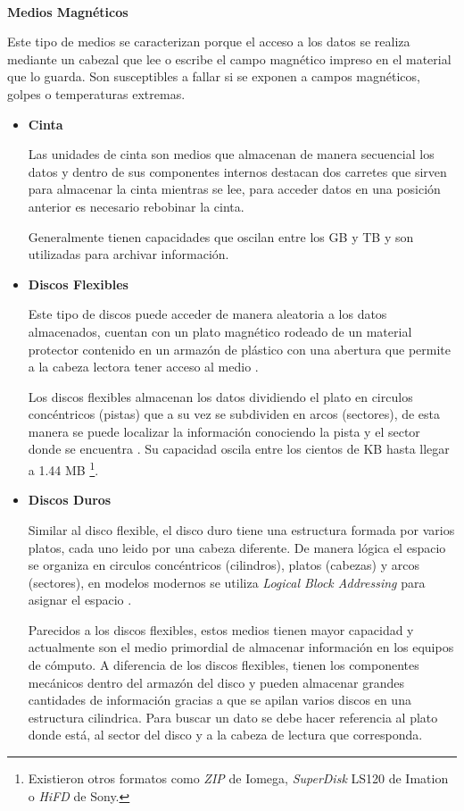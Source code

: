 \textbf{\\ Medios Magn\'{e}ticos \\}

Este tipo de medios se caracterizan porque el acceso a los datos se realiza mediante un cabezal que lee o escribe el campo magn\'{e}tico impreso en el material que lo guarda. Son susceptibles a fallar si se exponen a campos magn\'{e}ticos, golpes o temperaturas extremas.

\begin{itemize}

  \item \textbf{Cinta}

Las unidades de cinta son medios que almacenan de manera secuencial los datos y dentro de sus componentes internos destacan dos carretes que sirven para almacenar la cinta mientras se lee, para acceder datos en una posici\'{o}n anterior es necesario rebobinar la cinta.

Generalmente tienen capacidades que oscilan entre los \textsc{GB} y \textsc{TB}  \cite{_powervault_????} y son utilizadas para archivar informaci\'{o}n.

  \item \textbf{Discos Flexibles}

Este tipo de discos puede acceder de manera aleatoria a los datos almacenados, cuentan con un plato magn\'{e}tico rodeado de un material protector contenido en un armaz\'{o}n de pl\'{a}stico con una abertura que permite a la cabeza lectora tener acceso al medio \cite{_anatomy_????}.

Los discos flexibles almacenan los datos dividiendo el plato en circulos conc\'{e}ntricos (pistas) que a su vez se subdividen en arcos (sectores), de esta manera se puede localizar la informaci\'{o}n conociendo la pista y el sector donde se encuentra \cite{_illustrated_????}. Su capacidad oscila entre los cientos de \textsc{KB} hasta llegar a 1.44 \textsc{MB} \footnote{Existieron otros formatos como \textit{ZIP} de Iomega, \textit{SuperDisk} LS120 de Imation o \textit{HiFD} de Sony.}.

  \item \textbf{Discos Duros}

Similar al disco flexible, el disco duro tiene una estructura formada por varios platos, cada uno leido por una cabeza diferente. De manera l\'{o}gica el espacio se organiza en circulos conc\'{e}ntricos (cilindros), platos (cabezas) y arcos (sectores), en modelos modernos se utiliza \emph{Logical Block Addressing} para asignar el espacio \cite{_introduction_????}.

Parecidos a los discos flexibles, estos medios tienen mayor capacidad y actualmente son el medio primordial de almacenar informaci\'{o}n en los equipos de c\'{o}mputo. A diferencia de los discos flexibles, tienen los componentes mec\'{a}nicos dentro del armaz\'{o}n del disco y pueden almacenar grandes cantidades de informaci\'{o}n gracias a que se apilan varios discos en una estructura cilindrica. Para buscar un dato se debe hacer referencia al plato donde est\'{a}, al sector del disco y a la cabeza de lectura que corresponda.

\end{itemize}

